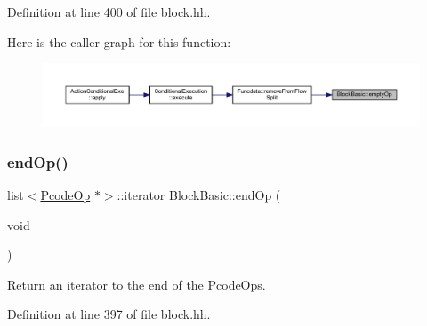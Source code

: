 Definition at line 400 of file block.\+hh.

Here is the caller graph for this function\+:
\nopagebreak
\begin{figure}[H]
\begin{center}
\leavevmode
\includegraphics[width=350pt]{class_block_basic_aedf26d0f0560d601eb54fb7303518545_icgraph}
\end{center}
\end{figure}
\mbox{\label{class_block_basic_abd3fc70635403ddb5c85c07b19c6f6b3}} 
\subsubsection{\texorpdfstring{endOp()}{endOp()}\hspace{0.1cm}{\footnotesize\ttfamily [1/2]}}
{\footnotesize\ttfamily list$<$\mbox{\hyperlink{class_pcode_op}{Pcode\+Op}} $\ast$$>$\+::iterator Block\+Basic\+::end\+Op (\begin{DoxyParamCaption}\item[{void}]{ }\end{DoxyParamCaption})\hspace{0.3cm}{\ttfamily [inline]}}



Return an iterator to the end of the Pcode\+Ops. 



Definition at line 397 of file block.\+hh.

